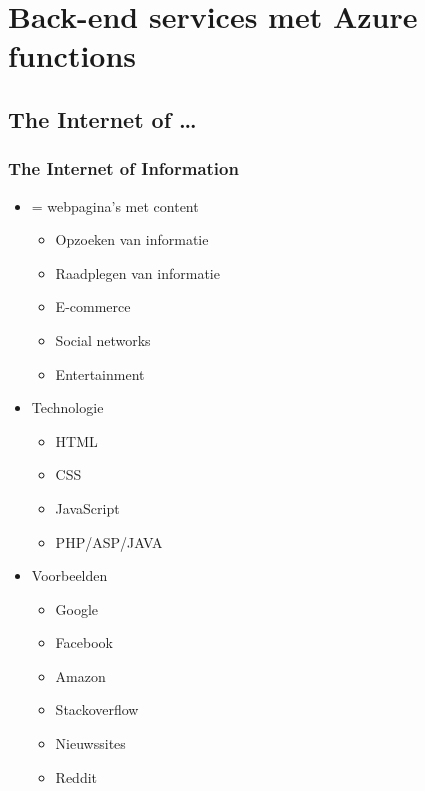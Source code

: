 \documentclass{article}
\begin{document}
\section{Back-end services met Azure functions}

\subsection{The Internet of \dots}

\subsubsection{The Internet of Information}
\begin{itemize}
    \item = webpagina’s met content
    \begin{itemize}
        \item Opzoeken van informatie
        \item Raadplegen van informatie
        \item E-commerce
        \item Social networks
        \item Entertainment
    \end{itemize}
    \item Technologie
    \begin{itemize}
        \item HTML
        \item CSS
        \item JavaScript
        \item PHP/ASP/JAVA
    \end{itemize}
    \item Voorbeelden
    \begin{itemize}
        \item Google
        \item Facebook
        \item Amazon
        \item Stackoverflow
        \item Nieuwssites
        \item Reddit
    \end{itemize}
\end{itemize}
\end{document}
